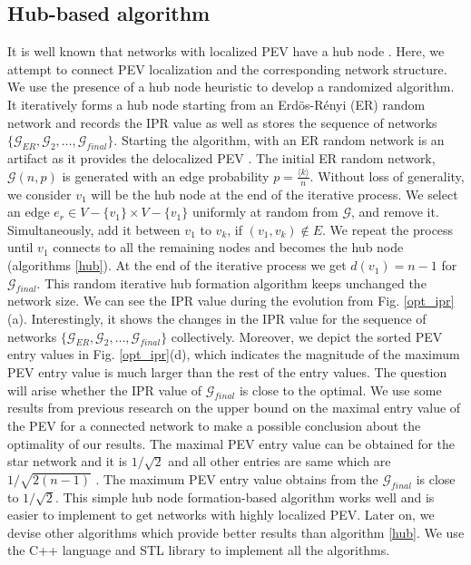 \documentclass[envcountreset,oribibl]{llncs}
\begin{document}
\subsection{Hub-based algorithm}
It is well known that networks with localized PEV have a hub node \cite{MZN2014}. Here, we attempt to connect PEV localization and the corresponding network structure. We use the presence of a hub node heuristic to develop a randomized algorithm. It iteratively forms a hub node starting from an Erd\"os-R\'enyi (ER) random network and records the IPR value as well as stores the sequence of networks $\{\mathcal{G}_{ER},\mathcal{G}_{2},\ldots,\mathcal{G}_{final}\}$. Starting the algorithm, with an ER random network is an artifact as it provides the delocalized PEV \cite{deloc_pev}. The initial ER random network, $\mathcal{G}(n,p)$ is generated with an edge probability $p=\frac{\langle k \rangle}{n}$. Without loss of generality, we consider $v_1$ will be the hub node at the end of the iterative process. We select an edge $e_r \in V-\{v_1\} \times V-\{v_1\}$ uniformly at random from $\mathcal{G}$, and remove it. Simultaneously, add it between $v_1$ to $v_k$, if $(v_1,v_k) \notin E$. We repeat the process until $v_1$ connects to all the remaining nodes and becomes the hub node (algorithms \ref{hub}). At the end of the iterative process we get $d(v_1)=n-1$ for $\mathcal{G}_{final}$.
This random iterative hub formation algorithm keeps unchanged the network size. We can see the IPR value during the evolution from Fig. \ref{opt_ipr}(a). Interestingly, it shows the changes in the IPR value for the sequence of networks $\{\mathcal{G}_{ER},\mathcal{G}_{2},\ldots,\mathcal{G}_{final}\}$ collectively. Moreover, we depict the sorted PEV entry values in Fig. \ref{opt_ipr}(d), which indicates the magnitude of the maximum PEV entry value is much larger than the rest of the entry values. The question will arise whether the IPR value of $\mathcal{G}_{final}$ is close to the optimal. We use some results from previous research on the upper bound on the maximal entry value of the PEV for a connected network to make a possible conclusion about the optimality of our results. The maximal PEV entry value can be obtained for the star network and it is $1/\sqrt{2}$ and all other entries are same which are $1/\sqrt{2(n-1)}$ \cite{bound_pev_entries_2000}. The maximum PEV entry value obtains from the $\mathcal{G}_{final}$ is close to $1/\sqrt{2}$. This simple hub node formation-based algorithm works well and is easier to implement to get networks with highly localized PEV. Later on, we devise other algorithms which provide better results than algorithm \ref{hub}. We use the C++ language and STL library to implement all the algorithms.
\end{document}
